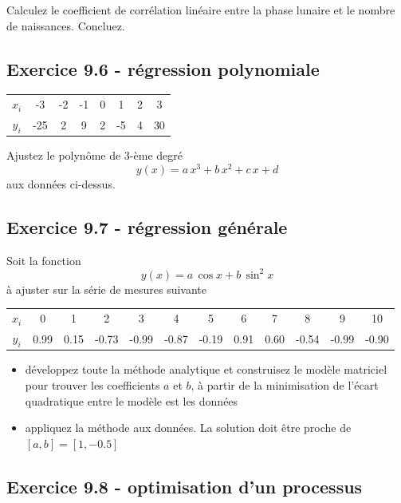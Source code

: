 Calculez le coefficient de corrélation linéaire entre la phase lunaire et le nombre de naissances. Concluez.

\subsection*{Exercice 9.6 - régression polynomiale}

\begin{center}
\begin{tabular}{c|ccccccc}
$x_i$ & -3 & -2 & -1 & 0 & 1 & 2 & 3\\
$y_i$ & -25 & 2 & 9 & 2 & -5 & 4 & 30
\end{tabular}
\end{center}
Ajustez le polynôme de 3-ème degré $$y(x)=a\,x^3+b\,x^2+c\,x+d$$ aux données ci-dessus.

\subsection*{Exercice 9.7 - régression générale}

Soit la fonction
$$
y(x)=a\,\cos{x}+b\,\sin^{2}{x}
$$
à ajuster sur la série de mesures suivante
\begin{center}
\begin{tabular}{c|ccccccccccc}
$x_i$ & 0 & 1 & 2 & 3 & 4 & 5 & 6 & 7 & 8 & 9 & 10\\
$y_i$ & 0.99 & 0.15 & -0.73 & -0.99 & -0.87 & -0.19 & 0.91 & 0.60 & -0.54 & -0.99 & -0.90
\end{tabular}
\end{center}
\begin{itemize}
\item développez toute la méthode analytique et construisez le modèle matriciel pour trouver les coefficients $a$ et $b$, à partir de la minimisation de l'écart quadratique entre le modèle est les données
\item appliquez la méthode aux données. La solution doit être proche de $[a,b]=[1,-0.5]$
\end{itemize}

\newpage

\subsection*{Exercice 9.8 - optimisation d'un processus}

